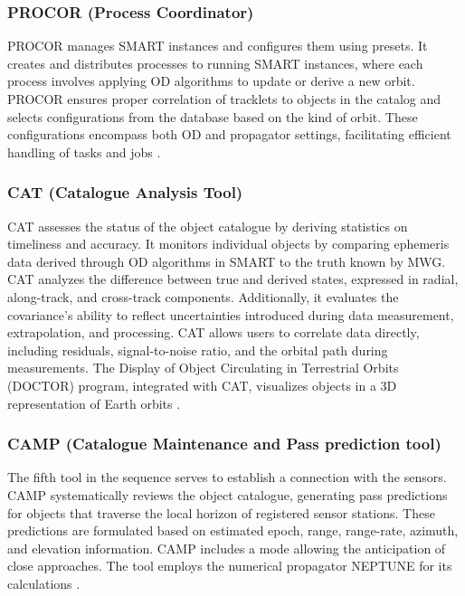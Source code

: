 \subsubsection{PROCOR (Process Coordinator)}
PROCOR manages SMART instances and configures them using presets. It creates and distributes processes to running SMART instances, where each process involves applying OD algorithms 
to update or derive a new orbit. PROCOR ensures proper correlation of tracklets to objects in the catalog and selects configurations from the database based on the kind of orbit. These configurations encompass both OD and 
propagator settings, facilitating efficient handling of tasks and jobs \cite{kebschull2017simulation}.

\subsubsection{CAT (Catalogue Analysis Tool)}
CAT assesses the status of the object catalogue by deriving statistics on timeliness and accuracy. It monitors individual objects by comparing ephemeris data derived through OD algorithms 
in SMART to the truth known by MWG. CAT analyzes the difference between true and derived states, expressed in radial, along-track, and cross-track components. Additionally, it evaluates the covariance's ability to reflect 
uncertainties introduced during data measurement, extrapolation, and processing. CAT allows users to correlate data directly, including residuals, signal-to-noise ratio, and the orbital path during measurements. The Display 
of Object Circulating in Terrestrial Orbits (DOCTOR) program, integrated with CAT, visualizes objects in a 3D representation of Earth orbits \cite{kebschull2017simulation}.

\subsubsection{CAMP (Catalogue Maintenance and Pass prediction tool)}
The fifth tool in the sequence serves to establish a connection with the sensors. CAMP systematically reviews the object catalogue, generating pass predictions for objects that traverse the local horizon of registered sensor 
stations. These predictions are formulated based on estimated epoch, range, range-rate, azimuth, and elevation information. CAMP includes a mode allowing the anticipation of close approaches. The tool employs the numerical 
propagator NEPTUNE for its calculations \cite{kebschull2017simulation}.

